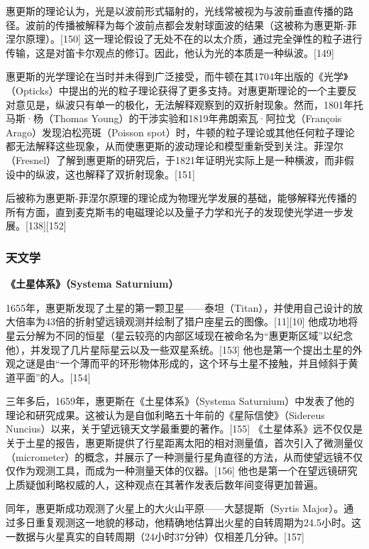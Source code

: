 惠更斯的理论认为，光是以波前形式辐射的，光线常被视为与波前垂直传播的路径。波前的传播被解释为每个波前点都会发射球面波的结果（这被称为惠更斯-菲涅尔原理）。[150] 这一理论假设了无处不在的以太介质，通过完全弹性的粒子进行传输，这是对笛卡尔观点的修订。因此，他认为光的本质是一种纵波。[149]

惠更斯的光学理论在当时并未得到广泛接受，而牛顿在其1704年出版的《光学》（Opticks）中提出的光的粒子理论获得了更多支持。对惠更斯理论的一个主要反对意见是，纵波只有单一的极化，无法解释观察到的双折射现象。然而，1801年托马斯·杨（Thomas Young）的干涉实验和1819年弗朗索瓦·阿拉戈（François Arago）发现泊松亮斑（Poisson spot）时，牛顿的粒子理论或其他任何粒子理论都无法解释这些现象，从而使惠更斯的波动理论和模型重新受到关注。菲涅尔（Fresnel）了解到惠更斯的研究后，于1821年证明光实际上是一种横波，而非假设中的纵波，这也解释了双折射现象。[151]

后被称为惠更斯-菲涅尔原理的理论成为物理光学发展的基础，能够解释光传播的所有方面，直到麦克斯韦的电磁理论以及量子力学和光子的发现使光学进一步发展。[138][152]
\subsubsection{天文学}
\textbf{《土星体系》（Systema Saturnium）}

1655年，惠更斯发现了土星的第一颗卫星——泰坦（Titan），并使用自己设计的放大倍率为43倍的折射望远镜观测并绘制了猎户座星云的图像。[11][10] 他成功地将星云分解为不同的恒星（星云较亮的内部区域现在被命名为“惠更斯区域”以纪念他），并发现了几片星际星云以及一些双星系统。[153] 他也是第一个提出土星的外观之谜是由“一个薄而平的环形物体形成的，这个环与土星不接触，并且倾斜于黄道平面”的人。[154]

三年多后，1659年，惠更斯在《土星体系》（Systema Saturnium）中发表了他的理论和研究成果。这被认为是自伽利略五十年前的《星际信使》（Sidereus Nuncius）以来，关于望远镜天文学最重要的著作。[155] 《土星体系》远不仅仅是关于土星的报告，惠更斯提供了行星距离太阳的相对测量值，首次引入了微测量仪（micrometer）的概念，并展示了一种测量行星角直径的方法，从而使望远镜不仅仅作为观测工具，而成为一种测量天体的仪器。[156] 他也是第一个在望远镜研究上质疑伽利略权威的人，这种观点在其著作发表后数年间变得更加普遍。

同年，惠更斯成功观测了火星上的大火山平原——大瑟提斯（Syrtis Major）。通过多日重复观测这一地貌的移动，他精确地估算出火星的自转周期为24.5小时。这一数据与火星真实的自转周期（24小时37分钟）仅相差几分钟。[157]